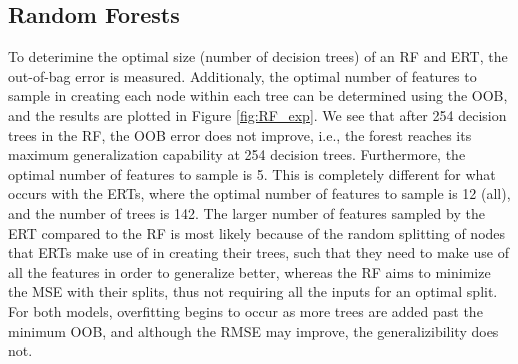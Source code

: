 \documentclass[a4paper, twoside, final, 12pt]{article}
\begin{document}
{\subsection{Random Forests}
To deterimine the optimal size (number of decision trees) of an RF and ERT, the out-of-bag error is measured. Additionaly, the optimal number of features to sample in creating each node within each tree can be determined using the OOB, and the results are plotted in Figure \ref{fig:RF_exp}. We see that after 254 decision trees in the RF, the OOB error does not improve, i.e., the forest reaches its maximum generalization capability at 254 decision trees. Furthermore, the optimal number of features to sample is 5. This is completely different for what occurs with the ERTs, where the optimal number of features to sample is 12 (all), and the number of trees is 142. The larger number of features sampled by the ERT compared to the RF is most likely because of the random splitting of nodes that ERTs make use of in creating their trees, such that they need to make use of all the features in order to generalize better, whereas the RF aims to minimize the MSE with their splits, thus not requiring all the inputs for an optimal split. For both models, overfitting begins to occur as more trees are added past the minimum OOB, and although the RMSE may improve, the generalizibility does not.

}
\end{document}

